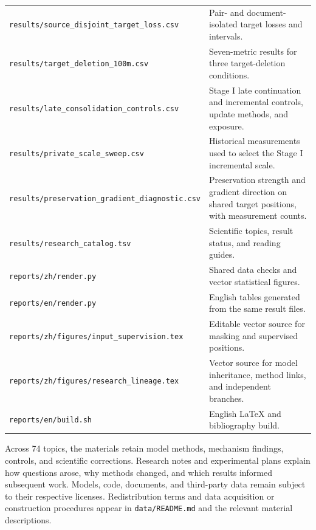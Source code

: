 \begin{longtable}{@{}P{69mm}P{81mm}@{}}
\nolinkurl{results/source_disjoint_target_loss.csv} & Pair- and document-isolated target losses and intervals.\\
\nolinkurl{results/target_deletion_100m.csv} & Seven-metric results for three target-deletion conditions.\\
\nolinkurl{results/late_consolidation_controls.csv} & Stage I late continuation and incremental controls, update methods, and exposure.\\
\nolinkurl{results/private_scale_sweep.csv} & Historical measurements used to select the Stage I incremental scale.\\
\nolinkurl{results/preservation_gradient_diagnostic.csv} & Preservation strength and gradient direction on shared target positions, with measurement counts.\\
\nolinkurl{results/research_catalog.tsv} & Scientific topics, result status, and reading guides.\\
\nolinkurl{reports/zh/render.py} & Shared data checks and vector statistical figures.\\
\nolinkurl{reports/en/render.py} & English tables generated from the same result files.\\
\nolinkurl{reports/zh/figures/input_supervision.tex} & Editable vector source for masking and supervised positions.\\
\nolinkurl{reports/zh/figures/research_lineage.tex} & Vector source for model inheritance, method links, and independent branches.\\
\nolinkurl{reports/en/build.sh} & English LaTeX and bibliography build.\\
\end{longtable}
\endgroup

Across 74 topics, the materials retain model methods, mechanism findings, controls, and scientific corrections. Research notes and experimental plans explain how questions arose, why methods changed, and which results informed subsequent work. Models, code, documents, and third-party data remain subject to their respective licenses. Redistribution terms and data acquisition or construction procedures appear in \nolinkurl{data/README.md} and the relevant material descriptions.
